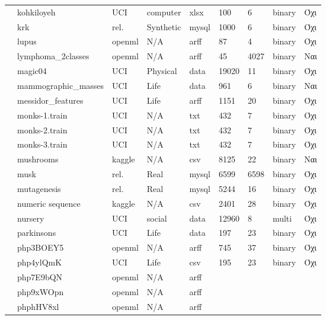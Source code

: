 {\begin{longtable}{|l| l| l | l | l | l |l | l | l | }
 							\rownumber & kohkiloyeh & UCI & computer& xlsx& 100 & 6 & binary & Όχι \\
 							\rownumber & krk \citep{krk} & rel. & Synthetic & mysql & 1000  & 6 & binary & Όχι \\
 							\rownumber & lupus \citep{lupus} & openml & N/A & arff & 87 & 4 & binary & Όχι \\
 							\rownumber & lymphoma\_2classes & openml & N/A & arff & 45 &4027 & binary& Nαι\\
 			\rownumber & magic04 & UCI & Physical & data & 19020 & 11 & binary & Όχι \\
 			\rownumber & mammographic\_masses & UCI & Life & data & 961 & 6 & binary & Ναι \\
 			\rownumber & messidor\_features\citep{messidor} & UCI & Life & arff &1151 &20 &binary &Όχι \\
 			\rownumber & monks-1.train \citep{monks} & UCI & N/A & txt & 432 & 7 & binary & Όχι \\
 			\rownumber & monks-2.train \citep{monks} & UCI & N/A & txt & 432 & 7 & binary & Όχι \\
 			\rownumber & monks-3.train \citep{monks}& UCI & N/A & txt & 432 & 7 & binary & Όχι \\
 			\rownumber & mushrooms \citep{mushroom} & kaggle & N/A & csv & 8125 & 22 & binary & Ναι \\
 			\rownumber & musk \citep{musk} & rel. & Real & mysql & 6599
 			  & 6598 & binary & Όχι \\
 			\rownumber & mutagenesis \citep{Mutagenesis} & rel. & Real & mysql & 5244 & 16 & binary & Όχι \\
 			\rownumber & numeric sequence \citep{sequence} & kaggle & N/A & csv & 2401 & 28 & binary & Όχι \\
 			\rownumber & nursery \citep{nursery} & UCI & social & data & 12960 & 8 & multi & Όχι \\
 			\rownumber & parkinsons \citep{parkinsons} & UCI & Life & data & 197 & 23 & binary & Όχι \\
 			\rownumber & php3BOEY5 \citep{pie} & openml & N/A & arff & 745  & 37  &  binary& Όχι \\
 			\rownumber & php4ylQmK \citep{thyroid} & UCI & Life & csv & 195 & 23 & binary & Όχι \\
 			\rownumber & php7E9bQN & openml & N/A & arff & & & & \\
 			\rownumber & php9xWOpn & openml & N/A & arff & & & & \\
 			\rownumber & phphHV8xl & openml & N/A & arff & & & & \\

\end{longtable}}
